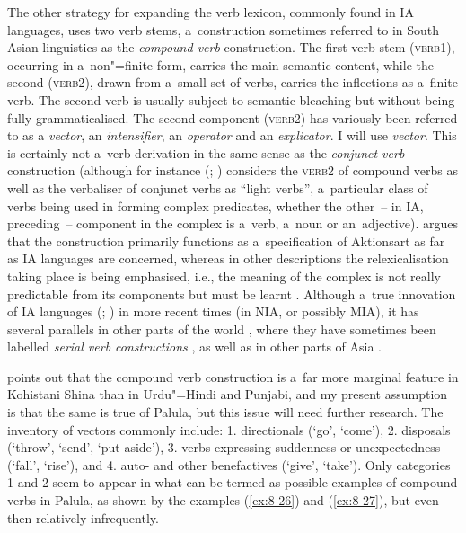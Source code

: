 The other strategy for expanding the verb lexicon, commonly found in IA languages, uses two verb stems, a~construction sometimes referred to in South Asian linguistics \citep[326]{masica1991} as the \textit{compound verb} construction. The first verb stem (\textsc{verb1}), occurring in a~non"=finite form, carries the main semantic content, while the second (\textsc{verb2}), drawn from a~small set of verbs, carries the inflections as a~finite verb. The second verb is usually subject to semantic bleaching but without being fully grammaticalised. The second component (\textsc{verb2}) has variously been referred to as a \textit{vector}, an \textit{intensifier}, an \textit{operator} and an \textit{explicator}. I will use \textit{vector}. This is certainly not a~verb derivation in the same sense as the \textit{conjunct verb} construction (although for instance \citeauthor{butt1993} (\citeyear[31]{butt1993}; \citeyear[49]{butt2010}) considers the \textsc{verb2} of compound verbs as well as the verbaliser of conjunct verbs as ``light verbs'', a~particular class of verbs being used in forming complex predicates, whether the other~-- in IA, preceding~-- component in the complex is a~verb, a~noun or an~adjective). \citet[326--330]{masica1991} argues that the construction primarily functions as a~specification of Aktionsart as far as IA languages are concerned, whereas in other descriptions the relexicalisation taking place is being emphasised, i.e., the meaning of the complex is not really predictable from its components but must be learnt \citep[143]{schmidt1999}. Although a~true innovation of IA languages (\citealt[326]{masica1991}; \citealt{hook1977}) in more recent times (in NIA, or possibly MIA), it has several parallels in other parts of the world \citep[348--349]{hook1977}, where they have sometimes been labelled \textit{serial verb constructions} \citep{ansaldo2006}, as well as in other parts of Asia \citep[559]{ebert2006}. 



\citet[20]{schmidt2004b} points out that the compound verb construction is a~far more marginal feature in Kohistani Shina than in Urdu"=Hindi and Punjabi, and my present assumption is that the same is true of Palula, but this issue will need further research. The inventory of vectors commonly include: 1. directionals (`go', `come'), 2. disposals (`throw', `send', `put aside'), 3. verbs expressing suddenness or unexpectedness (`fall', `rise'), and 4. auto- and other benefactives (`give', `take'). Only categories 1 and 2 seem to appear in what can be termed as possible examples of compound verbs in Palula, as shown by the examples (\ref{ex:8-26}) and (\ref{ex:8-27}), but even then relatively infrequently. 


